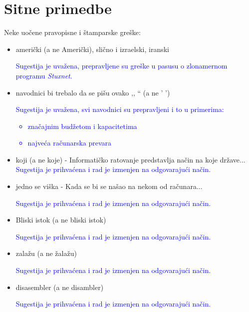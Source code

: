 \documentclass[a4paper]{report}
\newcommand{\odgovor}[1]{\textcolor{blue}{#1}}
\begin{document}
\section{Sitne primedbe}
Neke uočene pravopisne i štamparske greške:
\begin{itemize}
  \item američki (a ne Američki), slično i izraelski, iranski
  
  \odgovor{Sugestija je uvažena, prepravljene su greške u pasusu o zlonamernom programu \textit{Stuxnet}.}
  
  \item navodnici bi trebalo da se pišu ovako ,, `` (a ne ' ')
  
  \odgovor{Sugestija je uvažena, svi navodnici su prepravljeni i to u primerima:  \begin{itemize}
      \item značajnim budžetom i kapacitetima
      \item najveća računarska prevara
  \end{itemize}}
  
  \item koji (a ne koje) - Informatičko ratovanje predstavlja način na koje države...
  \odgovor{Sugestija je prihvaćena i rad je izmenjen na odgovarajući način.}

  
  \item jedno se viška - Kada se bi se našao na nekom od računara...
  
  \odgovor{Sugestija je prihvaćena i rad je izmenjen na odgovarajući način.}

  \item Bliski istok (a ne bliski istok)
  
  \odgovor{Sugestija je prihvaćena i rad je izmenjen na odgovarajući način.}

  \item zalažu (a ne žalažu)
  
  \odgovor{Sugestija je prihvaćena i rad je izmenjen na odgovarajući način.}

  \item disasembler (a ne disambler)
  
  \odgovor{Sugestija je prihvaćena i rad je izmenjen na odgovarajući način.}

\end{itemize}
\end{document}
